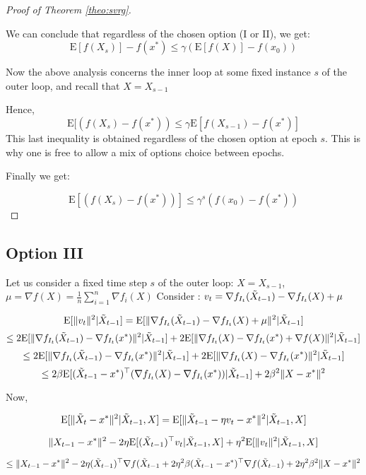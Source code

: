\documentclass[12pt]{report}
\newcounter{theo}[section]
\newcommand{\E}{\mathrm{E}}
\begin{document}
\begin{proof}[Proof of Theorem \ref{theo:svrg}]
\begin{itemize}
\end{itemize}

We can conclude that regardless of the chosen option (I or II), we get:
$$   \E[f(X_s)]-f(x^*) \leq \gamma(\E[f(X)]-f(x_0))  $$


Now the above analysis concerns the inner loop at some fixed instance $s$ of the outer loop, and recall that $X=X_{s-1}$

Hence,
$$\E[\left(f({X}_s)-f(x^*)\right) \leq \gamma\E[f({X}_{s-1})-f(x^*)]$$
This last inequality is obtained regardless of the chosen option at epoch $s$. This is why one is free to allow a mix of options choice between epochs.

Finally we get:

$$\E[\left(f({X}_s)-f(x^*)\right)]
\leq \gamma^s \left(f({x}_{0})-f(x^*)\right)$$
\end{proof}


\subsection{Option III}


Let us consider a fixed time step $s$ of the outer loop: $X=X_{s-1}$, $\mu=\nabla f(X)=\frac{1}{n}\sum_{i=1}^n\nabla f_i(X)$
\newline
Consider : $v_t=\nabla f_{I_t}(\Tilde{X}_{t-1})-\nabla f_{I_t}(X)+\mu$

$$\E[\|v_t\|^2|\Tilde{X}_{t-1}]=\E[\|\nabla f_{I_t}(\Tilde{X}_{t-1})-\nabla f_{I_t}(X)+\mu \|^2|\Tilde{X}_{t-1}]$$
$$\leq 2\E[\|\nabla f_{I_t}(\Tilde{X}_{t-1})-\nabla f_{I_t}(x^*) \|^2|\Tilde{X}_{t-1}] + 2\E[\|\nabla f_{I_t}(X)-\nabla f_{I_t}(x^*) + \nabla f(X)\|^2|\Tilde{X}_{t-1}]$$
$$\leq 2\E[\|\nabla f_{I_t}(\Tilde{X}_{t-1})-\nabla f_{I_t}(x^*) \|^2|\Tilde{X}_{t-1}] + 2\E[\|\nabla f_{I_t}(X)-\nabla f_{I_t}(x^*)\|^2|\Tilde{X}_{t-1}]$$
$$\leq 2\beta \E[(\Tilde{X}_{t-1}-x^*)^\top(\nabla f_{I_t}(X)-\nabla f_{I_t}(x^*))|\Tilde{X}_{t-1}]+2\beta^2\|X-x^*\|^2 $$

Now,

$$\E[\|\Tilde{X}_t-x^* \|^2|\Tilde{X}_{t-1},X] = \E[\|\Tilde{X}_{t-1}-\eta v_t-x^* \|^2|\Tilde{X}_{t-1},X]  $$

$$\|{X}_{t-1}-x^* \|^2-2\eta\E[(\Tilde{X}_{t-1})^\top v_t|\Tilde{X}_{t-1},X]+\eta^2\E[\| v_t\|^2|\Tilde{X}_{t-1},X] $$

$$\leq \|{X}_{t-1}-x^* \|^2-2\eta(\Tilde{X}_{t-1})^\top\nabla f(\Tilde{X}_{t-1}+2\eta^2\beta(\Tilde{X}_{t-1}-x^*)^\top\nabla f(\Tilde{X}_{t-1})+2\eta^2\beta^2\|X-x^* \|^2$$
\end{document}
